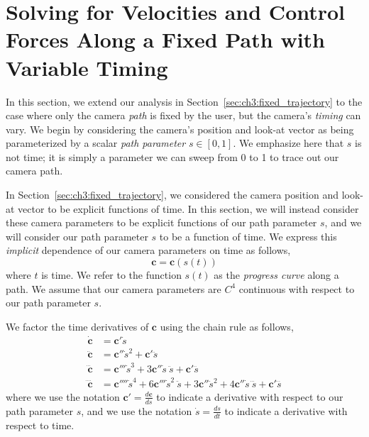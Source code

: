 \section{Solving for Velocities and Control Forces Along a Fixed Path with Variable Timing}
\label{sec:ch3:fixed_path}

In this section, we extend our analysis in Section~\ref{sec:ch3:fixed_trajectory} to the case where only the camera \emph{path} is fixed by the user, but the camera's \emph{timing} can vary.
We begin by considering the camera's position and look-at vector as being parameterized by a scalar \emph{path parameter} $s \in [0,1]$.
We emphasize here that $s$ is not time; it is simply a parameter we can sweep from 0 to 1 to trace out our camera path.

In Section~\ref{sec:ch3:fixed_trajectory}, we considered the camera position and look-at vector to be explicit functions of time.
In this section, we will instead consider these camera parameters to be explicit functions of our path parameter $s$, and we will consider our path parameter $s$ to be a function of time.
We express this \emph{implicit} dependence of our camera parameters on time as follows,
%
\begin{equation}
\mathbf{c} = \mathbf{c}(s(t))
\end{equation}
%
where $t$ is time.
We refer to the function $s(t)$ as the \emph{progress curve} along a path.
We assume that our camera parameters are $C^4$ continuous with respect to our path parameter $s$.

We factor the time derivatives of $\mathbf{c}$ using the chain rule as follows,
%
%
%
\begin{equation}
\begin{aligned}
\dot{\mathbf{c}}    & = \mathbf{c}' \dot{s} \\
\ddot{\mathbf{c}}   & = \mathbf{c}''   \dot{s}^2 +   \mathbf{c}'   \ddot{s} \\
\dddot{\mathbf{c}}  & = \mathbf{c}'''  \dot{s}^3 + 3 \mathbf{c}''  \dot{s}   ~\ddot{s} +   \mathbf{c}'  \dddot{s} \\
\ddddot{\mathbf{c}} & = \mathbf{c}'''' \dot{s}^4 + 6 \mathbf{c}''' \dot{s}^2 ~\ddot{s} + 3 \mathbf{c}'' \ddot{s}^2 + 4 \mathbf{c}'' \dot{s}~\dddot{s} + \mathbf{c}' \ddddot{s}
\end{aligned}
\label{eqn:ch3:cdotn}
\end{equation}
%
where we use the notation $\mathbf{c}' = \frac{d \mathbf{c}}{d s}$ to indicate a derivative with respect to our path parameter $s$, and we use the notation $\dot{s} = \frac{d s}{d t}$ to indicate a derivative with respect to time.

